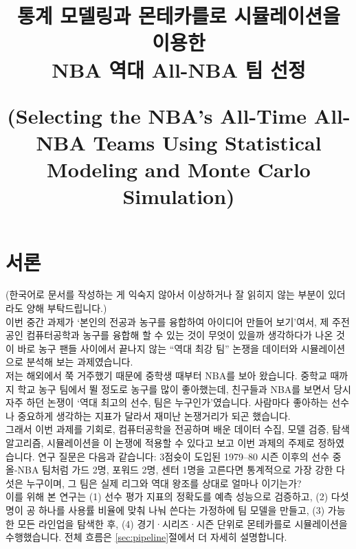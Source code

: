 \documentclass[conference,a4paper]{IEEEtran}
\begin{document}
\title{통계 모델링과 몬테카를로 시뮬레이션을 이용한\\NBA 역대 All-NBA 팀 선정\\[6pt]
{\Large (Selecting the NBA's All-Time All-NBA Teams Using Statistical Modeling and Monte Carlo Simulation)\par}}

\author{
}

\maketitle

\section{서론}
(한국어로 문서를 작성하는 게 익숙지 않아서 이상하거나 잘 읽히지 않는 부분이 있더라도 양해 부탁드립니다.)\\

이번 중간 과제가 `본인의 전공과 농구를 융합하여 아이디어 만들어 보기'여서, 제 주전공인 컴퓨터공학과 농구를 융합해 할 수 있는 것이 무엇이 있을까 생각하다가 나온 것이 바로 농구 팬들 사이에서 끝나지 않는 ``역대 최강 팀'' 논쟁을 데이터와 시뮬레이션으로 분석해 보는 과제였습니다.\\

저는 해외에서 쭉 거주했기 때문에 중학생 때부터 NBA를 보아 왔습니다. 중학교 때까지 학교 농구 팀에서 뛸 정도로 농구를 많이 좋아했는데, 친구들과 NBA를 보면서 당시 자주 하던 논쟁이 `역대 최고의 선수, 팀은 누구인가'였습니다. 사람마다 좋아하는 선수나 중요하게 생각하는 지표가 달라서 재미난 논쟁거리가 되곤 했습니다.\\

그래서 이번 과제를 기회로, 컴퓨터공학을 전공하며 배운 데이터 수집, 모델 검증, 탐색 알고리즘, 시뮬레이션을 이 논쟁에 적용할 수 있다고 보고 이번 과제의 주제로 정하였습니다. 연구 질문은 다음과 같습니다: 3점슛이 도입된 1979--80 시즌 이후의 선수 중 올-NBA 팀처럼 가드 2명, 포워드 2명, 센터 1명을 고른다면 통계적으로 가장 강한 다섯은 누구이며, 그 팀은 실제 리그와 역대 왕조를 상대로 얼마나 이기는가?\\

이를 위해 본 연구는 (1) 선수 평가 지표의 정확도를 예측 성능으로 검증하고, (2) 다섯 명이 공 하나를 사용률 비율에 맞춰 나눠 쓴다는 가정하에 팀 모델을 만들고, (3) 가능한 모든 라인업을 탐색한 후, (4) 경기·시리즈·시즌 단위로 몬테카를로 시뮬레이션을 수행했습니다. 전체 흐름은 \ref{sec:pipeline}절에서 더 자세히 설명합니다.
\end{document}
